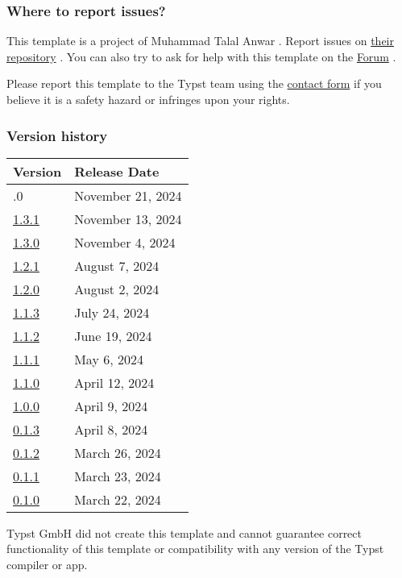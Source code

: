 \subsubsection{Where to report issues?}\label{where-to-report-issues}

This template is a project of Muhammad Talal Anwar . Report issues on
\href{https://github.com/talal/ilm}{their repository} . You can also try
to ask for help with this template on the
\href{https://forum.typst.app}{Forum} .

Please report this template to the Typst team using the
\href{https://typst.app/contact}{contact form} if you believe it is a
safety hazard or infringes upon your rights.

\label{versions}
\subsubsection{Version history}\label{version-history}

\begin{longtable}[]{@{}ll@{}}
\toprule\noalign{}
Version & Release Date \\
\midrule\noalign{}
\endhead
\bottomrule\noalign{}
\endlastfoot
1.4.0 & November 21, 2024 \\
\href{https://typst.app/universe/package/ilm/1.3.1/}{1.3.1} & November
13, 2024 \\
\href{https://typst.app/universe/package/ilm/1.3.0/}{1.3.0} & November
4, 2024 \\
\href{https://typst.app/universe/package/ilm/1.2.1/}{1.2.1} & August 7,
2024 \\
\href{https://typst.app/universe/package/ilm/1.2.0/}{1.2.0} & August 2,
2024 \\
\href{https://typst.app/universe/package/ilm/1.1.3/}{1.1.3} & July 24,
2024 \\
\href{https://typst.app/universe/package/ilm/1.1.2/}{1.1.2} & June 19,
2024 \\
\href{https://typst.app/universe/package/ilm/1.1.1/}{1.1.1} & May 6,
2024 \\
\href{https://typst.app/universe/package/ilm/1.1.0/}{1.1.0} & April 12,
2024 \\
\href{https://typst.app/universe/package/ilm/1.0.0/}{1.0.0} & April 9,
2024 \\
\href{https://typst.app/universe/package/ilm/0.1.3/}{0.1.3} & April 8,
2024 \\
\href{https://typst.app/universe/package/ilm/0.1.2/}{0.1.2} & March 26,
2024 \\
\href{https://typst.app/universe/package/ilm/0.1.1/}{0.1.1} & March 23,
2024 \\
\href{https://typst.app/universe/package/ilm/0.1.0/}{0.1.0} & March 22,
2024 \\
\end{longtable}

Typst GmbH did not create this template and cannot guarantee correct
functionality of this template or compatibility with any version of the
Typst compiler or app.
